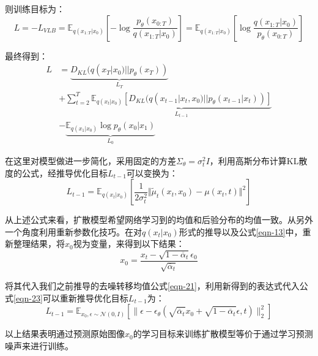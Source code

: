 \par
则训练目标为：
\begin{equation}\label{eqn-22}
L = - L_{VLB} = \mathbb{E}_{q(x_{1:T}|x_0)}[-\log{\frac{p_{\theta}(x_{0:T})}{q(x_{1:T}|x_0)}}] = \mathbb{E}_{q(x_{1:T}|x_0)}[\log{\frac{q(x_{1:T}|x_0)}{p_{\theta}(x_{0:T})}}]
\end{equation}
\par
最终得到：
\begin{align}
      L &= \underbrace{D_{KL}(q(x_T|x_0) || p_\theta(x_T))}_{L_T} \nonumber\\
      &+ \sum^T_{t=2}{\underbrace{\mathbb{E}_{q(x_t|x_0)}[D_{KL}(q(x_{t-1}|x_t,x_0) || p_\theta(x_{t-1}|x_t))]}_{L_{t-1}}} \nonumber\\
      &- \underbrace{\mathbb{E}_{q(x_1|x_0)}\log{p_\theta(x_0|x_1)}}_{L_0} \label{eqn-23}
\end{align}
\par
在这里对模型做进一步简化，采用固定的方差$\Sigma_\theta=\sigma^2_tI$，利用高斯分布计算KL散度的公式，经推导优化目标$L_{t-1}$可以变换为：
\begin{equation}\label{eqn-24}
L_{t-1}=\mathbb{E}_{q(x_t|x_0)}[\frac{1}{2\sigma^2_t}\Vert \widetilde{\mu}_t(x_t,x_0)-\mu(x_t,t) \Vert^2]
\end{equation}
\par
从上述公式来看，扩散模型希望网络学习到的均值和后验分布的均值一致。从另外一个角度利用重新参数化技巧。在对$q ( x_t | x_0 )$形式的推导以及公式\eqref{eqn-13}中，重新整理结果，将$x_0$视为变量，来得到以下结果：
\begin{equation}\label{eqn-25}
      x_0 = \frac{x_t - \sqrt{1-\overline{\alpha}_t}\epsilon_0}{\sqrt{\overline{\alpha}_t}}
\end{equation}
\par
将其代入我们之前推导的去噪转移均值公式\eqref{eqn-21}，利用新得到的表达式代入公式\eqref{eqn-23}可以重新推导优化目标$L_{t-1}$为：
\begin{equation}\label{eqn-26}
      L_{t-1}=\mathbb{E}_{x_0,\epsilon \sim \mathcal{N}(0,I)}[\lVert \epsilon - \epsilon_\theta (\sqrt{\overline{\alpha}_t}x_0 + \sqrt{1 - \overline{\alpha}_t}\epsilon,t)\rVert^2_2]
\end{equation}
\par
以上结果表明通过预测原始图像$x_0$的学习目标来训练扩散模型等价于通过学习预测噪声来进行训练。
